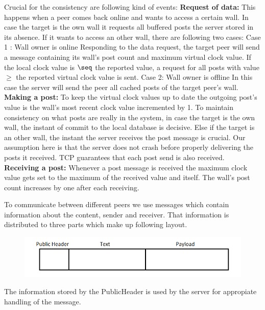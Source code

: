 \documentclass{report}
\newcommand{\lfig}[1]{\label{fig:#1}}
\begin{document}
Crucial for the consistency are following kind of events:\newline
\textbf{Request of data:} This happens when a peer comes back online and wants to access a certain wall.  
In case the target is the own wall it requests all buffered posts the server stored in its absence.
If it wants to access an other wall, there are following two cases:\newline
Case 1 : Wall owner is online
Responding to the data request, the target peer will send a message containing its wall's post count and maximum virtual clock value. If the local clock value is $\seq$ the reported value, a request for all posts with value $\geq$ the reported virtual clock value is sent.\newline
Case 2: Wall owner is offline
In this case the server will send the peer all cached posts of the target peer's wall.\newline
\textbf{Making a post:}
To keep the virtual clock values up to date the outgoing post's value is the wall's most recent clock value incremented by 1.\newline
To maintain consistency on what posts are really in the system, in case the target is the own wall, the instant of commit to the local database is decisive.
Else if the target is an other wall, the instant the server receives the post message is crucial. Our assumption here is that the server does not crash before properly delivering the posts it received. TCP guarantees that each post send is also received.\newline
\textbf{Receiving a post:}
Whenever a post message is received the maximum clock value gets set to the maximum of the received value and itself.  The wall's post count increases by one after each receiving.

To communicate between different peers we use messages which contain information about the content, sender and receiver. That information is distributed to three parts which make up following layout.

\begin{figure}[H]

	\centering
    \includegraphics[width=\columnwidth]{Layout.png}
    \lfig{Layout}
    \vspace{-5mm} %
\end{figure}
The information stored by the PublicHeader is used by the server for appropiate handling of the message.  
\end{document}

